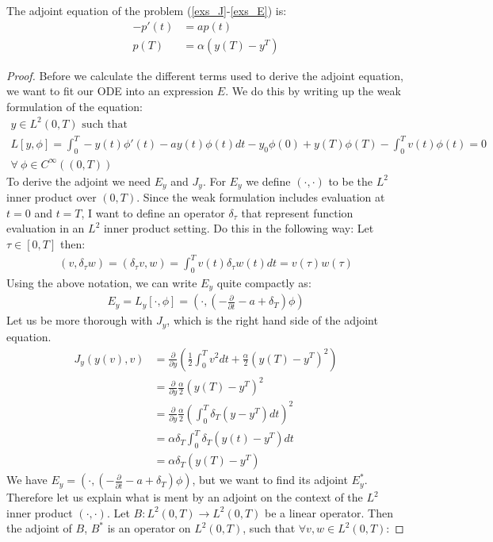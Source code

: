 \begin{theorem}
The adjoint equation of the problem (\ref{exs_J}-\ref{exs_E}) is:
\begin{align*}     
-p'(t) &= ap(t) \\
p(T) &= \alpha(y(T)-y^T)     
\end{align*}
\end{theorem}
\begin{proof}
Before we calculate the different terms used to derive the adjoint equation, we want to fit our ODE into an expression $E$. We do this by writing up the weak formulation of the equation:
\begin{gather*}
\textrm{$y \in L^2(0,T)$ such that}\\
L[y,\phi] = \int_0^T-y(t)\phi'(t)-ay(t)\phi(t)dt -y_0\phi(0)+y(T)\phi(T)-\int_0^Tv(t)\phi(t)=0\\ \forall \ \phi \in C^{\infty}((0,T))
\end{gather*}
To derive the adjoint we need $E_y$ and $J_y$. For $E_y$ we define $(\cdot,\cdot)$ to be the $L^2$ inner product over $(0,T)$. Since the weak formulation includes evaluation at $t=0$ and $t=T$, I want to define an operator $\delta_{\tau}$ that represent function evaluation in an $L^2$ inner product setting. Do this in the following way: Let $\tau \in [0,T]$ then:
\begin{align*}
(v,\delta_{\tau}w) =(\delta_{\tau}v,w) = \int_0^Tv(t)\delta_{\tau}w(t)dt = v(\tau)w(\tau)
\end{align*}
Using the above notation, we can write $E_y$ quite compactly as:
\begin{align*}
E_y=L_y[\cdot,\phi]=(\cdot,(-\frac{\partial}{\partial t} - a + \delta_T)\phi)  
\end{align*}
Let us be more thorough with $J_y$, which is the right hand side of the adjoint equation.
\begin{align*}
J_y(y(v),v) &= \frac{\partial}{\partial y}(\frac{1}{2}\int_0^Tv^2dt + \frac{\alpha}{2}(y(T)-y^T)^2) \\ &= \frac{\partial}{\partial y} \frac{\alpha}{2}(y(T)-y^T)^2 \\
&= \frac{\partial}{\partial y}\frac{\alpha}{2}(\int_0^T \delta_T(y-y^T)dt)^2 \\
&= \alpha\delta_T\int_0^T \delta_T(y(t)-y^T)dt \\
&= \alpha\delta_T(y(T)-y^T)
\end{align*}
We have $E_y=(\cdot,(-\frac{\partial}{\partial t} - a + \delta_T)\phi)$, but we want to find its adjoint $E_y^*$. Therefore let us explain what is ment by an adjoint on the context of the $L^2$ inner product $(\cdot,\cdot)$. Let $B:L^2(0,T)\rightarrow L^2(0,T)$ be a linear operator. Then the adjoint of $B$, $B^*$ is an operator on $ L^2(0,T)$, such that $\forall v,w\in L^2(0,T)$:

\end{proof}
